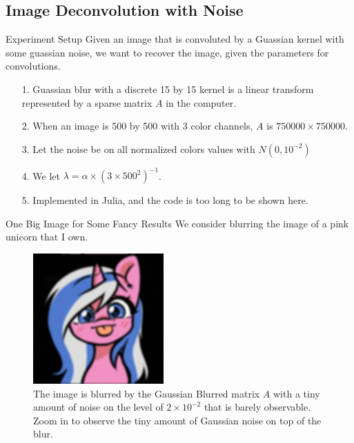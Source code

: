 \subsection{Image Deconvolution with Noise}
\begin{frame}{Experiment Setup}
    Given an image that is convoluted by a Guassian kernel with some guassian noise, we want to recover the image, given the parameters for convolutions. 
    \begin{itemize}
        \item [1.] Guassian blur with a discrete 15 by 15 kernel is a linear transform represented by a sparse matrix $A$ in the computer. 
        \item [2.] When an image is 500 by 500 with 3 color channels, $A$ is $750000 \times 750000$. 
        \item [3.] Let the noise be on all normalized colors values with $N(0, 10^{-2})$
        \item [4.] We let $\lambda = \alpha\times (3\times500^2)^{-1}$. 
        \item [5.] Implemented in Julia, and the code is too long to be shown here. 
    \end{itemize}        
\end{frame}
\begin{frame}{One Big Image for Some Fancy Results}
    We consider blurring the image of a pink unicorn that I own. 
    \begin{figure}[H]
        \centering
        \includegraphics[width=5cm]{Assets/blurred_img.jpg}
        \caption{The image is blurred by the Gaussian Blurred matrix $A$ with a tiny amount of noise on the level of $2\times 10^{-2}$ that is barely observable. Zoom in to observe the tiny amount of Gaussian noise on top of the blur.}
        \label{fig:blurred_alto}
    \end{figure}
\end{frame}
